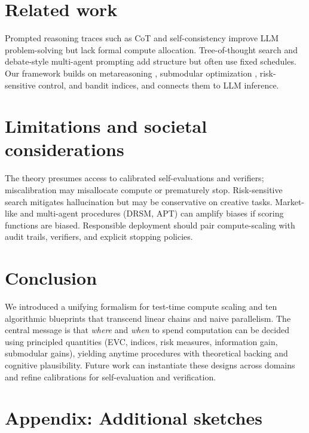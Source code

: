 \documentclass[11pt]{article}
\newcommand{\1}{\mathbb{I}}
\begin{document}
\section{Related work}

Prompted reasoning traces such as CoT \cite{wei2022cot} and self-consistency \cite{wang2023selfconsistency} improve LLM problem-solving but lack formal compute allocation. 
Tree-of-thought search \cite{yao2023tot} and debate-style multi-agent prompting \cite{irving2018debate} add structure but often use fixed schedules. 
Our framework builds on metareasoning \cite{russellwefald1991,horvitz1989,liedergriffiths2020}, submodular optimization \cite{nemhauser1978}, risk-sensitive control, and bandit indices, and connects them to LLM inference.

\section{Limitations and societal considerations}

The theory presumes access to calibrated self-evaluations and verifiers; miscalibration may misallocate compute or prematurely stop. 
Risk-sensitive search mitigates hallucination but may be conservative on creative tasks. 
Market-like and multi-agent procedures (DRSM, APT) can amplify biases if scoring functions are biased. 
Responsible deployment should pair compute-scaling with audit trails, verifiers, and explicit stopping policies.

\section{Conclusion}

We introduced a unifying formalism for test-time compute scaling and ten algorithmic blueprints that transcend linear chains and naive parallelism. 
The central message is that \emph{where} and \emph{when} to spend computation can be decided using principled quantities (EVC, indices, risk measures, information gain, submodular gains), yielding anytime procedures with theoretical backing and cognitive plausibility.
Future work can instantiate these designs across domains and refine calibrations for self-evaluation and verification.

\appendix

\section*{Appendix: Additional sketches}
\end{document}

